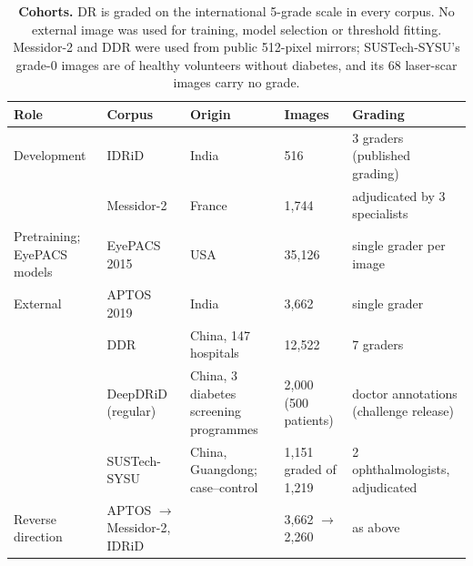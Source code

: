 \begin{table}[t]
\caption{\textbf{Cohorts.} DR is graded on the international 5-grade scale
in every corpus. No external image was used for training, model selection or
threshold fitting. Messidor-2 and DDR were used from public 512-pixel mirrors; SUSTech-SYSU's
grade-0 images are of healthy volunteers without diabetes, and its 68 laser-scar images carry no grade.}\label{tab:cohorts}
\centering\footnotesize\setlength{\tabcolsep}{3pt}
\begin{tabular}{@{}p{2.3cm}p{3.1cm}p{2.4cm}p{2.3cm}p{2.7cm}@{}}
\toprule
Role & Corpus & Origin & Images & Grading \\
\midrule
Development & IDRiD & India & 516 & 3 graders (published grading) \\
 & Messidor-2 & France & 1,744 & adjudicated by 3 specialists \\
Pretraining; EyePACS models & EyePACS 2015 & USA & 35,126 & single grader per image \\
External & APTOS 2019 & India & 3,662 & single grader \\
 & DDR & China, 147 hospitals & 12,522 & 7 graders \\
 & DeepDRiD (regular) & China, 3 diabetes screening programmes & 2,000 (500 patients) & doctor annotations (challenge release) \\
 & SUSTech-SYSU & China, Guangdong; case--control & 1,151 graded of 1,219 & 2 ophthalmologists, adjudicated \\
Reverse direction & APTOS $\rightarrow$ Messidor-2, IDRiD &  & 3,662 $\rightarrow$ 2,260 & as above \\
\bottomrule
\end{tabular}
\end{table}
